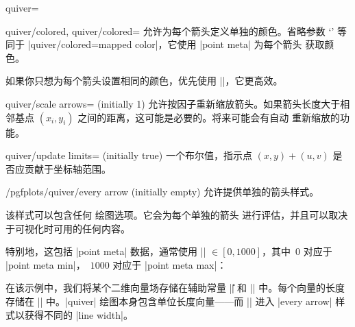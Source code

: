 {\begin{plottype}[/pgfplots]{quiver=%
    \textcolor{black}{}%
}
    \begin{pgfplotskeylist}{%
        quiver/colored,
        quiver/colored=%
    }
        允许为每个箭头定义单独的颜色。省略参数 `' 等同于
        |quiver/colored=mapped color|，它使用 |point meta| 为每个箭头
        获取颜色。

        如果你只想为每个箭头设置相同的颜色，优先使用
        ||，它更高效。
    \end{pgfplotskeylist}

    \begin{pgfplotskey}{quiver/scale arrows= (initially 1)}
        允许按因子重新缩放箭头。如果箭头长度大于相邻基点
        $(x_i,y_i)$ 之间的距离，这可能是必要的。将来可能会有自动
        重新缩放的功能。
    \end{pgfplotskey}

    \begin{pgfplotskey}{quiver/update limits= (initially true)}
        一个布尔值，指示点 $(x,y) + (u,v)$ 是否应贡献于坐标轴范围。
    \end{pgfplotskey}

    \begin{stylekey}{/pgfplots/quiver/every arrow (initially empty)}
        允许提供单独的箭头样式。

        该样式可以包含任何 \Tikz{} 绘图选项。它会为每个单独的箭头
        进行评估，并且可以取决于可视化时可用的任何内容。

        特别地，这包括 |point meta| 数据，通常使用
        |\pgfplotspointmetatransformed| $\in [0,1000]$，其中~$0$
        对应于 |point meta min|，~$1000$ 对应于 |point meta max|：
    \label{pgfplots:example:pointmeta:quiver}
\begin{codeexample}[]
\end{codeexample}
        \noindent 在该示例中，我们将某个二维向量场存储在辅助常量
        |\U| 和 |\V| 中。每个向量的长度存储在 |\LEN| 中。|quiver|
        绘图本身包含单位长度向量——而 |\LEN| 进入 |every arrow|
        样式以获得不同的 |line width|。


\end{stylekey}
\end{plottype}}
